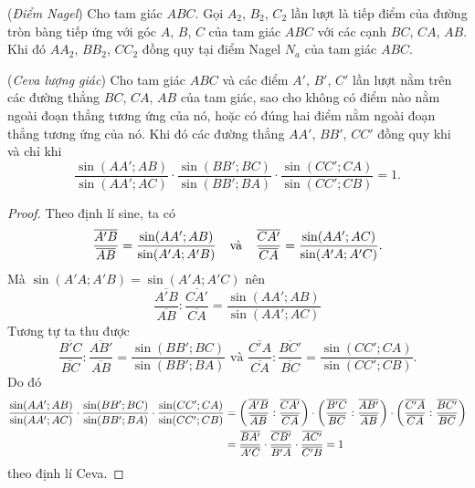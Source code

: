         \begin{corollary}
            (\textit{Điểm Nagel}) Cho tam giác \(ABC\). Gọi \(A_2\), \(B_2\), \(C_2\) lần lượt là tiếp điểm của đường tròn bàng tiếp ứng với góc \(A\), \(B\), \(C\) của tam giác \(ABC\) với các cạnh \(BC\), \(CA\), \(AB\). Khi đó \(AA_2\), \(BB_2\), \(CC_2\) đồng quy tại điểm Nagel \(N_a\) của tam giác \(ABC\). 
        \end{corollary}

        \begin{theorem}
            (\textit{Ceva lượng giác}) Cho tam giác \(ABC\) và các điểm \(A'\), \(B'\), \(C'\) lần lượt nằm trên các đường thẳng \(BC\), \(CA\), \(AB\) của tam giác, sao cho không có điểm nào nằm ngoài đoạn thẳng tương ứng của nó, hoặc có đúng hai điểm nằm ngoài đoạn thẳng tương ứng của nó. Khi đó các đường thẳng \(AA'\), \(BB'\), \(CC'\) đồng quy khi và chỉ khi
            \[\frac{\sin (AA';AB)}{\sin (AA';AC)} \cdot \frac{\sin (BB';BC)}{\sin (BB';BA)} \cdot \frac{\sin (CC';CA)}{\sin (CC';CB)} = 1.\]
        \end{theorem}

        \begin{proof}
            Theo định lí sine, ta có
            \[\frac{\overline{A'B}}{\overline{AB}} = \frac{\sin (AA';AB)}{\sin (A'A;A'B)} \hspace{0.25cm} \text{ và } \hspace{0.25cm} \frac{\overline{CA'}}{\overline{CA}} = \frac{\sin (AA';AC)}{\sin (A'A;A'C)}.\]
            Mà \(\sin (A'A;A'B) = \sin (A'A;A'C)\) nên
            \[\frac{\overline{A'B}}{\overline{AB}} : \frac{\overline{CA'}}{\overline{CA}} = \frac{\sin (AA';AB)}{\sin (AA';AC)}\]
            Tương tự ta thu được
            \[\frac{\overline{B'C}}{\overline{BC}} : \frac{\overline{AB'}}{\overline{AB}} = \frac{\sin (BB';BC)}{\sin (BB';BA)} \text{ và } \frac{\overline{C'A}}{\overline{CA}} : \frac{\overline{BC'}}{\overline{BC}} = \frac{\sin (CC';CA)}{\sin (CC';CB)}.\]
            Do đó
            \begin{equation}
                \begin{aligned}
                    \frac{\sin (AA';AB)}{\sin (AA';AC)} \cdot \frac{\sin (BB';BC)}{\sin (BB';BA)} \cdot \frac{\sin (CC';CA)}{\sin (CC';CB)}
                    & = \left(\frac{\overline{A'B}}{\overline{AB}} : \frac{\overline{CA'}}{\overline{CA}}\right) \cdot \left(\frac{\overline{B'C}}{\overline{BC}} : \frac{\overline{AB'}}{\overline{AB}}\right) \cdot \left(\frac{\overline{C'A}}{\overline{CA}} : \frac{\overline{BC'}}{\overline{BC}}\right) \\
                    & = \frac{\overline{BA'}}{\overline{A'C}} \cdot \frac{\overline{CB'}}{\overline{B'A}} \cdot \frac{\overline{AC'}}{\overline{C'B}} = 1
                \end{aligned}
                \notag
            \end{equation}
            theo định lí Ceva.
        \end{proof}

